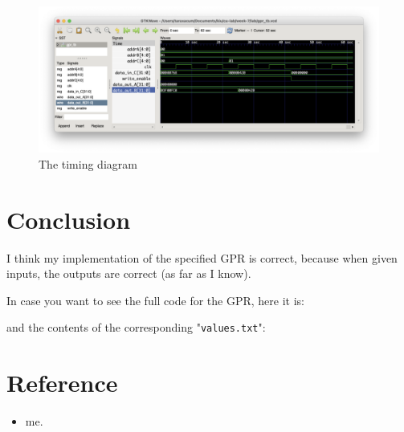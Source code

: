\documentclass{article}
\begin{document}
\begin{enumerate}
{            

            \begin{figure}[h] \caption{The timing diagram}
                \includegraphics[width=12cm]{timing-diagram.png}
            \end{figure}
        }
    \end{enumerate}

    \section*{Conclusion}

    I think my implementation of the specified GPR is correct, because when given inputs, the outputs are correct (as far as I know).
    
    In case you want to see the full code for the GPR, here it is:
    
    

    and the contents of the corresponding "\verb|values.txt|":

    

    \section*{Reference}
    
    \begin{itemize}
        \item me.
    \end{itemize}
\end{document}
